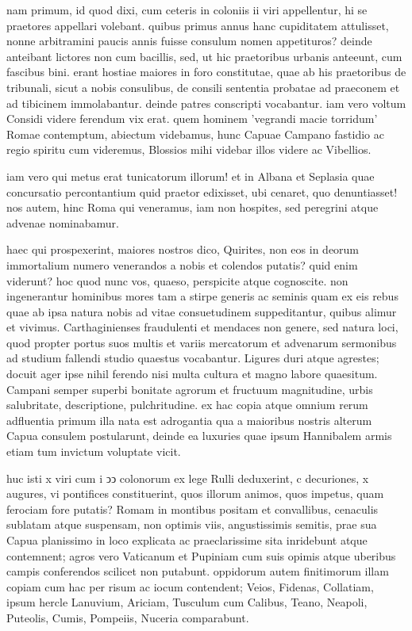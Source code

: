  nam primum, id quod dixi, cum ceteris in coloniis ii viri appellentur, hi se praetores appellari volebant. quibus primus annus hanc cupiditatem attulisset, nonne arbitramini paucis annis fuisse consulum nomen appetituros? deinde anteibant lictores non cum bacillis, sed, ut hic praetoribus urbanis anteeunt, cum fascibus bini. erant hostiae maiores in foro constitutae, quae ab his praetoribus de tribunali, sicut a nobis consulibus, de consili sententia probatae ad praeconem et ad tibicinem immolabantur. deinde patres conscripti vocabantur. iam vero voltum Considi videre ferendum vix erat. quem hominem 'vegrandi macie torridum' Romae contemptum, abiectum videbamus, hunc Capuae Campano fastidio ac regio spiritu cum videremus, Blossios mihi videbar illos videre ac Vibellios.

 iam vero qui metus erat tunicatorum illorum! et in Albana et Seplasia quae concursatio percontantium quid praetor edixisset, ubi cenaret, quo denuntiasset! nos autem, hinc Roma qui veneramus, iam non hospites, sed peregrini atque advenae nominabamur.

 haec qui prospexerint, maiores nostros dico, Quirites, non eos in deorum immortalium numero venerandos a nobis et colendos putatis? quid enim viderunt? hoc quod nunc vos, quaeso, perspicite atque cognoscite. non ingenerantur hominibus mores tam a stirpe generis ac seminis quam ex eis rebus quae ab ipsa natura nobis ad vitae consuetudinem suppeditantur, quibus alimur et vivimus. Carthaginienses fraudulenti et mendaces non genere, sed natura loci, quod propter portus suos multis et variis mercatorum et advenarum sermonibus ad studium fallendi studio quaestus vocabantur. Ligures duri atque agrestes; docuit ager ipse nihil ferendo nisi multa cultura et magno labore quaesitum. Campani semper superbi bonitate agrorum et fructuum magnitudine, urbis salubritate, descriptione, pulchritudine. ex hac copia atque omnium rerum adfluentia primum illa nata est adrogantia qua a maioribus nostris alterum Capua consulem postularunt, deinde ea luxuries quae ipsum Hannibalem armis etiam tum invictum voluptate vicit.

 huc isti x viri cum i ↄↄ colonorum ex lege Rulli deduxerint, c decuriones, x augures, vi pontifices constituerint, quos illorum animos, quos impetus, quam ferociam fore putatis? Romam in montibus positam et convallibus, cenaculis sublatam atque suspensam, non optimis viis, angustissimis semitis, prae sua Capua planissimo in loco explicata ac praeclarissime sita inridebunt atque contemnent; agros vero Vaticanum et Pupiniam cum suis opimis atque uberibus campis conferendos scilicet non putabunt. oppidorum autem finitimorum illam copiam cum hac per risum ac iocum contendent; Veios, Fidenas, Collatiam, ipsum hercle Lanuvium, Ariciam, Tusculum cum Calibus, Teano, Neapoli, Puteolis, Cumis, Pompeiis, Nuceria comparabunt.


